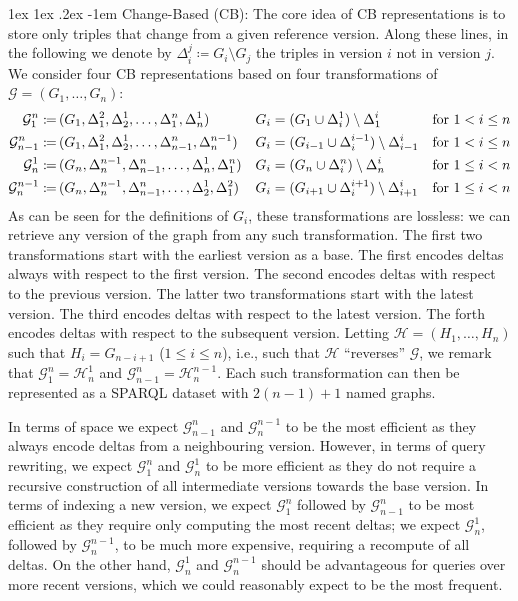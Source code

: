 \documentclass{llncs}
\makeatletter
\renewcommand\paragraph{\@startsection{paragraph}{4}{\z@}%
	{1ex \@plus1ex \@minus.2ex}%
	{-1em}%
	{\normalfont\normalsize\itshape}}
\newcommand{\da}{\ensuremath{:\nolinebreak\mkern-1.2mu\nolinebreak=}}
\makeatother
\begin{document}
\paragraph{Change-Based (CB):} The core idea of CB representations is to store only triples that change from a given reference version. Along these lines, in the following we denote by $\Delta_{i}^j \coloneqq G_i \setminus G_j$ the triples in version $i$ not in version $j$. We consider four CB representations based on four transformations of $\mathcal{G} = (G_1,\ldots,G_n)$:
%
{\footnotesize
\begin{align*}
\mathcal{G}^n_1 \da\,& (G_1,\Delta_1^2,\Delta_2^1,\ldots,\Delta_1^n,\Delta_n^1) & G_i & = (G_1 \cup \Delta_i^1) \setminus \Delta_1^i & \text{for }1 < i \leq n\\
\mathcal{G}^n_{n-1} \da\,& (G_1,\Delta_1^2,\Delta_2^1,\ldots,\Delta_{n-1}^n,\Delta_n^{n-1}) & G_i & = (G_{i-1} \cup \Delta_i^{i-1}) \setminus \Delta_{i-1}^i & \text{for }1 < i \leq n \\
\mathcal{G}^1_n \da\,& (G_n,\Delta_n^{n-1},\Delta_{n-1}^n,\ldots,\Delta_n^1,\Delta_1^n) & G_i & = (G_n \cup \Delta_i^n) \setminus \Delta_n^i & \text{for }1 \leq i < n \\
\mathcal{G}^{n-1}_n \da\,& (G_n,\Delta_n^{n-1},\Delta_{n-1}^n,\ldots,\Delta_2^1,\Delta_1^2) & G_i & = (G_{i+1} \cup \Delta_i^{i+1}) \setminus \Delta_{i+1}^i & \text{for }1 \leq i < n
\end{align*}%
}%
%
As can be seen for the definitions of $G_i$, these transformations are lossless: we can retrieve any version of the graph from any such transformation. The first two transformations start with the earliest version as a base. The first encodes deltas always with respect to the first version. The second encodes deltas with respect to the previous version. The latter two transformations start with the latest version. The third encodes deltas with respect to the latest version. The forth encodes deltas with respect to the subsequent version. Letting $\mathcal{H} = (H_1,\ldots,H_n)$ such that $H_i = G_{n-i+1}$ ($1 \leq i \leq n$), i.e., such that $\mathcal{H}$ ``reverses'' $\mathcal{G}$, we remark that $\mathcal{G}^n_1 = \mathcal{H}^1_n$ and $\mathcal{G}^n_{n-1} = \mathcal{H}^{n-1}_n$. Each such transformation can then be represented as a SPARQL dataset with $2(n-1)+1$ named graphs.

In terms of space we expect $\mathcal{G}^n_{n-1}$ and $\mathcal{G}^{n-1}_n$ to be the most efficient as they always encode deltas from a neighbouring version. However, in terms of query rewriting, we expect $\mathcal{G}^n_{1}$ and $\mathcal{G}^{1}_n$ to be more efficient as they do not require a recursive construction of all intermediate versions towards the base version. In terms of indexing a new version, we expect $\mathcal{G}^{n}_1$ followed by $\mathcal{G}^{n}_{n-1}$ to be most efficient as they require only computing the most recent deltas; we expect $\mathcal{G}^{1}_n$, followed by $\mathcal{G}^{n-1}_{n}$, to be much more expensive, requiring a recompute of all deltas. On the other hand, $\mathcal{G}^{1}_n$ and $\mathcal{G}^{n-1}_{n}$ should be advantageous for queries over more recent versions, which we could reasonably expect to be the most frequent.
\end{document}
